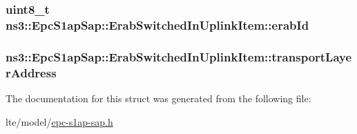 \subsubsection[{\texorpdfstring{erab\+Id}{erabId}}]{\setlength{\rightskip}{0pt plus 5cm}uint8\+\_\+t ns3\+::\+Epc\+S1ap\+Sap\+::\+Erab\+Switched\+In\+Uplink\+Item\+::erab\+Id}\hypertarget{structns3_1_1EpcS1apSap_1_1ErabSwitchedInUplinkItem_a3a59a2c6404e966375c3523c85cbf744}{}\label{structns3_1_1EpcS1apSap_1_1ErabSwitchedInUplinkItem_a3a59a2c6404e966375c3523c85cbf744}
\subsubsection[{\texorpdfstring{transport\+Layer\+Address}{transportLayerAddress}}]{ ns3\+::\+Epc\+S1ap\+Sap\+::\+Erab\+Switched\+In\+Uplink\+Item\+::transport\+Layer\+Address}\hypertarget{structns3_1_1EpcS1apSap_1_1ErabSwitchedInUplinkItem_aee52f31baf83ab9dbd29c0e945908cc3}{}\label{structns3_1_1EpcS1apSap_1_1ErabSwitchedInUplinkItem_aee52f31baf83ab9dbd29c0e945908cc3}


The documentation for this struct was generated from the following file\+:\begin{DoxyCompactItemize}
\item 
lte/model/\hyperlink{epc-s1ap-sap_8h}{epc-\/s1ap-\/sap.\+h}\end{DoxyCompactItemize}
